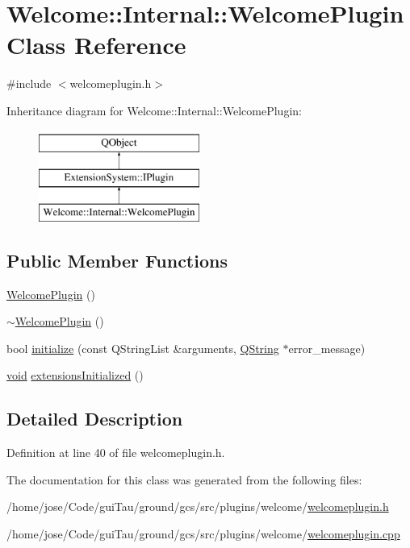 \hypertarget{class_welcome_1_1_internal_1_1_welcome_plugin}{\section{Welcome\-:\-:Internal\-:\-:Welcome\-Plugin Class Reference}
\label{class_welcome_1_1_internal_1_1_welcome_plugin}
}


{\ttfamily \#include $<$welcomeplugin.\-h$>$}

Inheritance diagram for Welcome\-:\-:Internal\-:\-:Welcome\-Plugin\-:\begin{figure}[H]
\begin{center}
\leavevmode
\includegraphics[height=3.000000cm]{class_welcome_1_1_internal_1_1_welcome_plugin}
\end{center}
\end{figure}
\subsection*{Public Member Functions}
\begin{DoxyCompactItemize}
\item 
\hyperlink{group___welcome_plugin_gacfac7b166995a1d17463cee3c3f9ba83}{Welcome\-Plugin} ()
\item 
\hyperlink{group___welcome_plugin_ga5b42a68f1e63d6cbac39b81ee1b809ff}{$\sim$\-Welcome\-Plugin} ()
\item 
bool \hyperlink{group___welcome_plugin_gaf4200dea591acb8135c4f4e8e6b42c52}{initialize} (const Q\-String\-List \&arguments, \hyperlink{group___u_a_v_objects_plugin_gab9d252f49c333c94a72f97ce3105a32d}{Q\-String} $\ast$error\-\_\-message)
\item 
\hyperlink{group___u_a_v_objects_plugin_ga444cf2ff3f0ecbe028adce838d373f5c}{void} \hyperlink{group___welcome_plugin_gac1e50ee0aacda1d9e1b3bc829d0d4014}{extensions\-Initialized} ()
\end{DoxyCompactItemize}


\subsection{Detailed Description}


Definition at line 40 of file welcomeplugin.\-h.



The documentation for this class was generated from the following files\-:\begin{DoxyCompactItemize}
\item 
/home/jose/\-Code/gui\-Tau/ground/gcs/src/plugins/welcome/\hyperlink{welcomeplugin_8h}{welcomeplugin.\-h}\item 
/home/jose/\-Code/gui\-Tau/ground/gcs/src/plugins/welcome/\hyperlink{welcomeplugin_8cpp}{welcomeplugin.\-cpp}\end{DoxyCompactItemize}
